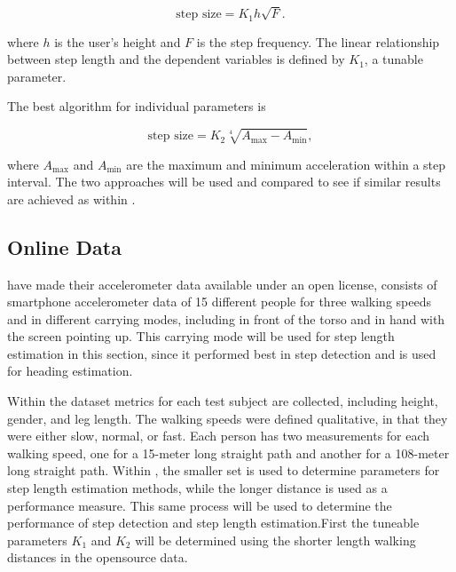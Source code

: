\begin{equation}
	\label{eq:Tian2016_sle2}
	\text{step size} = K_1 h \sqrt{F}.
\end{equation}


where $h$ is the user's height and $F$ is the step frequency. The linear relationship between step length and the dependent variables is defined by $ K_1 $, a tunable parameter. \par 

The best algorithm for individual parameters is 

\begin{equation}
	\text{step size} =K_2 \sqrt[4]{A_{\max }-A_{\min }},
	\label{eq:weinberg_stepsize2}
\end{equation}

where $A_{\max}$ and $A_{\min}$ are the maximum and minimum acceleration within a step interval. The two approaches will be used and compared to see if similar results are achieved as within \cite{Vezocnik2019}.

\subsection{Online Data}

\citet{Vezocnik2019} have made their accelerometer data available under an open license, consists of smartphone accelerometer data of 15 different people for three walking speeds and in different carrying modes, including in front of the torso and in hand with the screen pointing up. This carrying mode will be used for step length estimation in this section, since it performed best in step detection and is used for heading estimation. \par 
Within the dataset metrics for each test subject are collected, including height, gender, and leg length. The walking speeds were defined qualitative, in that they were either slow, normal, or fast. Each person has two measurements for each walking speed, one for a 15-meter long straight path and another for a 108-meter long straight path. Within \cite{Vezocnik2019}, the smaller set is used to determine parameters for step length estimation methods, while the longer distance is used as a performance measure. This same process will be used to determine the performance of step detection and step length estimation.First the tuneable parameters $ K_1$ and $ K_2$ will be determined using the shorter length walking distances in the opensource data. \par 

